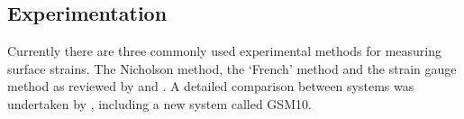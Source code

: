 \subsection{Experimentation}
Currently there are three commonly used experimental methods for measuring
surface strains. The Nicholson method, the `French' method and the strain
gauge method as reviewed by \cite{Murphy_2005} and \cite{yang2005measurement}. A detailed comparison between systems was undertaken by \cite{kamarudin2014new}, including a new system called GSM10.  